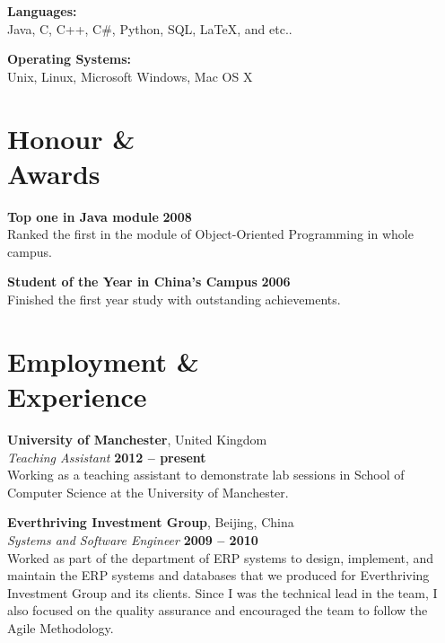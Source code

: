 \documentclass[margin,line]{resume}
\begin{document}
\begin{resume}
    \textbf{Languages:} \vspace{2mm}\\\vspace{1mm}%
    Java, C, C++, C\#, Python, SQL, \LaTeX{}, and etc..

    \textbf{Operating Systems:} \vspace{2mm}\\\vspace{1mm}%
    Unix, Linux, Microsoft Windows, Mac OS X


    \section{\mysidestyle Honour \&\\Awards}

    \textbf{Top one in Java module} \hfill \textbf{2008}\vspace{2mm}\\\vspace{1mm}%
    Ranked the first in the module of Object-Oriented Programming in whole campus.

    \textbf{Student of the Year in China's Campus} \hfill \textbf{2006}\vspace{2mm}\\\vspace{1mm}%
    Finished the first year study with outstanding achievements.


    \section{\mysidestyle Employment \&\\Experience}

    \textbf{University of Manchester}, United Kingdom           \vspace{2mm}\\\vspace{1mm}%
    \textsl{Teaching Assistant} \hfill \textbf{2012 -- present} \vspace{2mm}\\\vspace{1mm}%
    Working as a teaching assistant to demonstrate lab sessions in School of Computer Science at the University of Manchester.

    \textbf{Everthriving Investment Group}, Beijing, China              \vspace{2mm}\\\vspace{1mm}%
    \textsl{Systems and Software Engineer} \hfill \textbf{2009 -- 2010} \vspace{2mm}\\\vspace{1mm}%
    Worked as part of the department of ERP systems to design, implement, and maintain the ERP systems and databases that we produced for Everthriving Investment Group and its clients. Since I was the technical lead in the team, I also focused on the quality assurance and encouraged the team to follow the Agile Methodology.


\end{resume}
\end{document}
